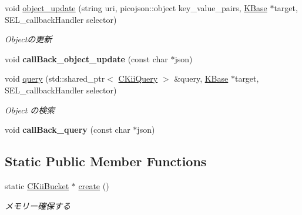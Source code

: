\begin{DoxyCompactItemize}
\item 
void \hyperlink{class_c_kii_bucket_ac27e14262fc99b06f62c46b05d8af931}{object\-\_\-update} (string uri, picojson\-::object key\-\_\-value\-\_\-pairs, \hyperlink{class_k_base}{K\-Base} $\ast$target, S\-E\-L\-\_\-callback\-Handler selector)
\begin{DoxyCompactList}\small\item\em Objectの更新 \end{DoxyCompactList}\item 
\hypertarget{class_c_kii_bucket_aca9a0b2e3caf7495711312828632bd8e}{void {\bfseries call\-Back\-\_\-object\-\_\-update} (const char $\ast$json)}\label{class_c_kii_bucket_aca9a0b2e3caf7495711312828632bd8e}

\item 
void \hyperlink{class_c_kii_bucket_acef1cee45f4922be88438089dad555e1}{query} (std\-::shared\-\_\-ptr$<$ \hyperlink{class_c_kii_query}{C\-Kii\-Query} $>$ \&query, \hyperlink{class_k_base}{K\-Base} $\ast$target, S\-E\-L\-\_\-callback\-Handler selector)
\begin{DoxyCompactList}\small\item\em Object の検索 \end{DoxyCompactList}\item 
\hypertarget{class_c_kii_bucket_aa36a27887af9177dc7809da7b723bb47}{void {\bfseries call\-Back\-\_\-query} (const char $\ast$json)}\label{class_c_kii_bucket_aa36a27887af9177dc7809da7b723bb47}

\end{DoxyCompactItemize}
\subsection*{Static Public Member Functions}
\begin{DoxyCompactItemize}
\item 
static \hyperlink{class_c_kii_bucket}{C\-Kii\-Bucket} $\ast$ \hyperlink{class_c_kii_bucket_a282979b68d7540433bfb24a4624702de}{create} ()
\begin{DoxyCompactList}\small\item\em メモリー確保する \end{DoxyCompactList}\end{DoxyCompactItemize}
